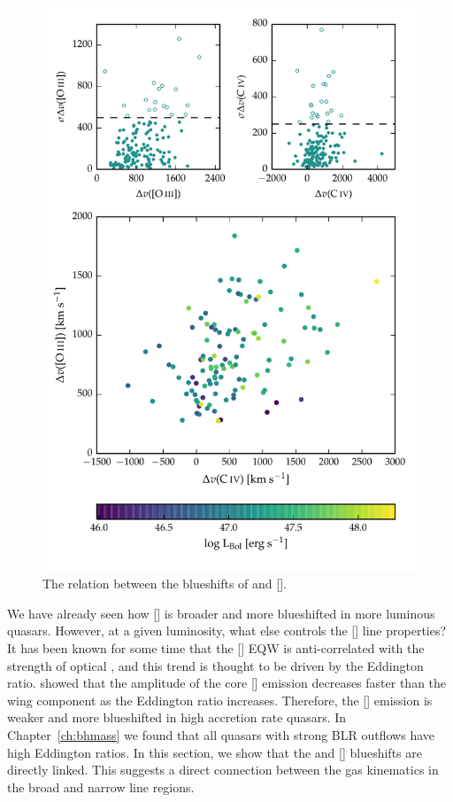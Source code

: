 \begin{figure}
    \includegraphics[width=\columnwidth]{figures/chapter04/civ_blueshift_oiii_blueshift.pdf} 
    \caption[{The relation between the blueshifts of  and [].}]{The relation between the blueshifts of  and [].}     
    \label{fig:oiii_civ_blueshifts}
\end{figure}

We have already seen how [] is broader and more blueshifted in more luminous quasars. 
However, at a given luminosity, what else controls the [] line properties? 
It has been known for some time that the [] EQW is anti-correlated with the strength of optical , and this trend is thought to be driven by the Eddington ratio. 
\citet{shen14} showed that the amplitude of the core [] emission decreases faster than the wing component as the Eddington ratio increases. 
Therefore, the [] emission is weaker and more blueshifted in high accretion rate quasars.  
In Chapter~\ref{ch:bhmass} we found that all quasars with strong BLR outflows have high Eddington ratios. 
In this section, we show that the  and [] blueshifts are directly linked. 
This suggests a direct connection between the gas kinematics in the broad and narrow line regions. 

